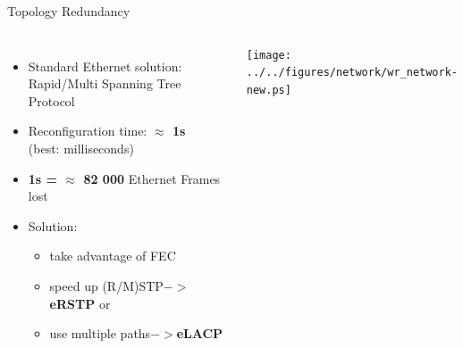 \documentclass[compress,red]{beamer}
\begin{document}
\begin{frame}{Topology Redundancy}

\begin{columns}[c]

      \begin{itemize}
	    \item Standard Ethernet solution: Rapid/Multi Spanning Tree Protocol
	    \item Reconfiguration time: \textbf{$\approx$ 1s} \\ (best: milliseconds)
	    \item \textbf{1s = $\approx$ 82 000} Ethernet Frames lost
	    \item Solution:
	    \begin{itemize}
		  \item take advantage of FEC
		  \item speed up (R/M)STP$->$\textbf{eRSTP} or
		  \item use multiple paths$->$\textbf{eLACP}
	    \end{itemize}

      \end{itemize}
% 
    \begin{center}
    \texttt{[image: ../../figures/network/wr\_network-new.ps]}
    \end{center}
\end{columns}

\end{frame}
\end{document}
